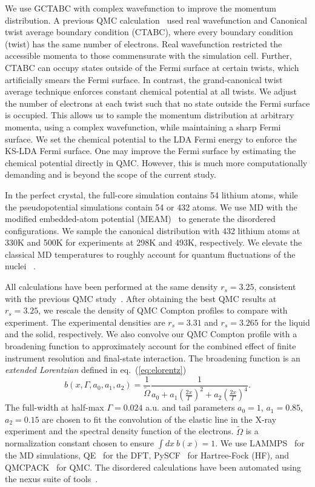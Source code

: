 \documentclass[aps,prb,showpacs,preprintnumbers,amsmath,amssymb,superscriptaddress,twocolumn]{revtex4-1}
\begin{document}
We use GCTABC with complex wavefunction to improve the momentum distribution. A previous QMC calculation~\cite{Filippi1999} used real wavefunction and Canonical twist average boundary condition (CTABC), where every boundary condition (twist) has the same number of electrons. Real wavefunction restricted the accessible momenta to those commensurate with the simulation cell. Further, CTABC can occupy states outside of the Fermi surface at certain twists, which artificially smears the Fermi surface. In contrast, the grand-canonical twist average technique enforces constant chemical potential at all twists. We adjust the number of electrons at each twist such that no state outside the Fermi surface is occupied. This allows us to sample the momentum distribution at arbitrary momenta, using a complex wavefunction, while maintaining a sharp Fermi surface. We set the chemical potential to the LDA Fermi energy to enforce the KS-LDA Fermi surface. One may improve the Fermi surface by estimating the chemical potential directly in QMC. However, this is much more computationally demanding and is beyond the scope of the current study.

In the perfect crystal, the full-core simulation contains 54 lithium atoms, while the pseudopotential simulations contain 54 or 432 atoms. We use MD with the modified embedded-atom potential (MEAM)~\cite{Baskes1992} to generate the disordered configurations. We sample the canonical distribution with 432 lithium atoms at 330K and 500K for experiments at 298K and 493K, respectively. We elevate the classical MD temperatures to roughly account for quantum fluctuations of the nuclei ~\cite{Filippi1998}.

All calculations have been performed at the same density $r_s=3.25$, consistent with the previous QMC study~\cite{Filippi1999}. After obtaining the best QMC results at $r_s=3.25$, we rescale the density of QMC Compton profiles to compare with experiment. The experimental densities are $r_s=3.31$ and $r_s=3.265$ for the liquid and the solid, respectively. We also convolve our QMC Compton profile with a broadening function to approximately account for the combined effect of finite instrument resolution and final-state interaction. The broadening function is an \emph{extended Lorentzian} defined in eq.~(\ref{eq:elorentz})
\begin{equation}
b(x,\Gamma,a_0,a_1, a_2) = \frac{1}{\tilde{\Omega}} \frac{1}{
a_0+a_1(\frac{2x}{\Gamma})^2+a_2(\frac{2x}{\Gamma})^4
}.\label{eq:elorentz}
\end{equation}
The full-width at half-max $\Gamma=0.024$ a.u. and tail parameters $a_0=1$, $a_1=0.85$, $a_2=0.15$ are chosen to fit the convolution of the elastic line in the X-ray experiment and the spectral density function of the electrons. $\tilde{\Omega}$ is a normalization constant chosen to ensure $\int dx ~b(x)=1$. We use LAMMPS~\cite{Plimpton1993} for the MD simulations, QE~\cite{Giannozzi2009,Enkovaara2017} for the DFT, PySCF~\cite{PYSCF} for Hartree-Fock (HF), and QMCPACK~\cite{Kim2018} for QMC. The disordered calculations have been automated using the nexus suite of tools~\cite{Krogel2016}.
\end{document}
